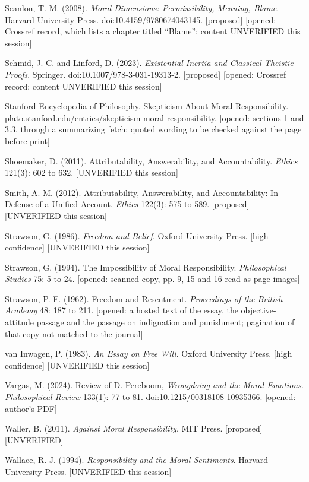 \documentclass[11pt]{article}
\begin{document}
Scanlon, T. M. (2008). \emph{Moral Dimensions: Permissibility, Meaning, Blame}. Harvard University Press. doi:10.4159/\allowbreak{}9780674043145. [proposed] [opened: Crossref record, which lists a chapter titled ``Blame''; content UNVERIFIED this session]

Schmid, J. C. and Linford, D. (2023). \emph{Existential Inertia and Classical Theistic Proofs}. Springer. doi:10.1007/\allowbreak{}978-3-031-19313-2. [proposed] [opened: Crossref record; content UNVERIFIED this session]

Stanford Encyclopedia of Philosophy. Skepticism About Moral Responsibility. plato.stanford.edu/\allowbreak{}entries/\allowbreak{}skepticism-moral-responsibility. [opened: sections 1 and 3.3, through a summarizing fetch; quoted wording to be checked against the page before print]

Shoemaker, D. (2011). Attributability, Answerability, and Accountability. \emph{Ethics} 121(3): 602 to 632. [UNVERIFIED this session]

Smith, A. M. (2012). Attributability, Answerability, and Accountability: In Defense of a Unified Account. \emph{Ethics} 122(3): 575 to 589. [proposed] [UNVERIFIED this session]

Strawson, G. (1986). \emph{Freedom and Belief}. Oxford University Press. [high confidence] [UNVERIFIED this session]

Strawson, G. (1994). The Impossibility of Moral Responsibility. \emph{Philosophical Studies} 75: 5 to 24. [opened: scanned copy, pp. 9, 15 and 16 read as page images]

Strawson, P. F. (1962). Freedom and Resentment. \emph{Proceedings of the British Academy} 48: 187 to 211. [opened: a hosted text of the essay, the objective-attitude passage and the passage on indignation and punishment; pagination of that copy not matched to the journal]

van Inwagen, P. (1983). \emph{An Essay on Free Will}. Oxford University Press. [high confidence] [UNVERIFIED this session]

Vargas, M. (2024). Review of D. Pereboom, \emph{Wrongdoing and the Moral Emotions}. \emph{Philosophical Review} 133(1): 77 to 81. doi:10.1215/\allowbreak{}00318108-10935366. [opened: author's PDF]

Waller, B. (2011). \emph{Against Moral Responsibility}. MIT Press. [proposed] [UNVERIFIED]

Wallace, R. J. (1994). \emph{Responsibility and the Moral Sentiments}. Harvard University Press. [UNVERIFIED this session]
\end{document}
